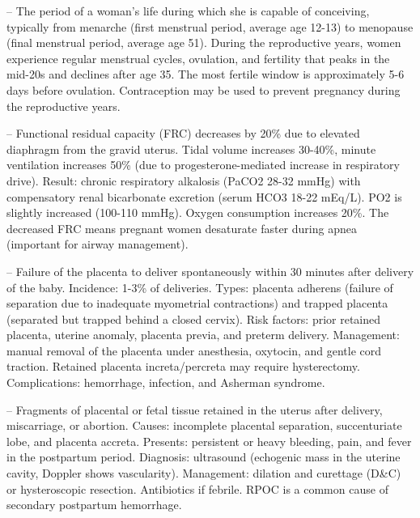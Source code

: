 -- The period of a woman's life during which she is capable of conceiving, typically from menarche (first menstrual period, average age 12-13) to menopause (final menstrual period, average age 51). During the reproductive years, women experience regular menstrual cycles, ovulation, and fertility that peaks in the mid-20s and declines after age 35. The most fertile window is approximately 5-6 days before ovulation. Contraception may be used to prevent pregnancy during the reproductive years.

-- Functional residual capacity (FRC) decreases by 20\% due to elevated diaphragm from the gravid uterus. Tidal volume increases 30-40\%, minute ventilation increases 50\% (due to progesterone-mediated increase in respiratory drive). Result: chronic respiratory alkalosis (PaCO2 28-32 mmHg) with compensatory renal bicarbonate excretion (serum HCO3 18-22 mEq/L). PO2 is slightly increased (100-110 mmHg). Oxygen consumption increases 20\%. The decreased FRC means pregnant women desaturate faster during apnea (important for airway management).

-- Failure of the placenta to deliver spontaneously within 30 minutes after delivery of the baby. Incidence: 1-3\% of deliveries. Types: placenta adherens (failure of separation due to inadequate myometrial contractions) and trapped placenta (separated but trapped behind a closed cervix). Risk factors: prior retained placenta, uterine anomaly, placenta previa, and preterm delivery. Management: manual removal of the placenta under anesthesia, oxytocin, and gentle cord traction. Retained placenta increta/percreta may require hysterectomy. Complications: hemorrhage, infection, and Asherman syndrome.

-- Fragments of placental or fetal tissue retained in the uterus after delivery, miscarriage, or abortion. Causes: incomplete placental separation, succenturiate lobe, and placenta accreta. Presents: persistent or heavy bleeding, pain, and fever in the postpartum period. Diagnosis: ultrasound (echogenic mass in the uterine cavity, Doppler shows vascularity). Management: dilation and curettage (D\&C) or hysteroscopic resection. Antibiotics if febrile. RPOC is a common cause of secondary postpartum hemorrhage.

